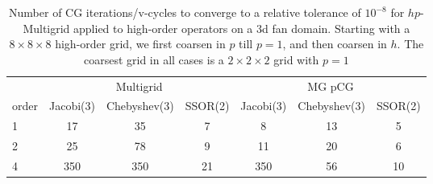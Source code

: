 \begin{table}
  \caption{\label{tab:fan3p} Number of CG iterations/v-cycles to converge to a relative tolerance of $10^{-8}$ for $hp$-Multigrid applied to high-order operators on a 3d fan domain. Starting with a $8\times 8\times 8$ high-order grid, we first coarsen in $p$ till $p=1$, and then coarsen in $h$. The coarsest grid in all cases is a $2\times 2\times 2$ grid with $p=1$}
		\centering
		\begin{tabular}{|l|c|c|c|c|c|c|} 
	    \hline
				    & \multicolumn{3}{c|}{Multigrid} & \multicolumn{3}{c|}{MG pCG}\\  \cline{2-7}
			order & \scriptsize Jacobi(3)  &\scriptsize  Chebyshev(3)  &\scriptsize SSOR(2) &\scriptsize Jacobi(3)  &\scriptsize  Chebyshev(3)  &\scriptsize SSOR(2) \\
			\hline
        1 & 17 & 35 & 7 & 8 & 13 & 5 \\
        2 & 25 & 78 & 9 & 11 & 20 & 6 \\
        4 & 350 & 350 & 21 & 350 & 56 & 10 \\
      \hline
	  \end{tabular}
\end{table}

